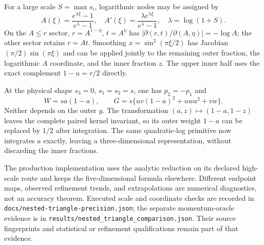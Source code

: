 For a large scale $S=\max s_i$, logarithmic nodes may be assigned by
\[
 A(\xi)=\frac{e^{\lambda\xi}-1}{e^\lambda-1},\quad
 A'(\xi)=\frac{\lambda e^{\lambda\xi}}{e^\lambda-1},\quad
 \lambda=\log(1+S).
\]
On the $A\le r$ sector, $r=A^{1-\eta}$, $t=A^\eta$ has
$|\partial(r,t)/\partial(A,\eta)|=-\log A$; the other sector retains
$r=At$. Smoothing $x=\sin^2(\pi\xi/2)$ has Jacobian
$(\pi/2)\sin(\pi\xi)$ and can be applied jointly to the remaining outer
fraction, the logarithmic $A$ coordinate, and the inner fraction $z$.
The upper inner half uses the exact complement $1-u=r/2$ directly.

At the physical shape $s_3=0$, $s_1=s_2=s$, one has $p_2=-p_1$ and
\[
 W=sa(1-a),\qquad
 G=s\{uv(1-a)^2+uwa^2+vw\}.
\]
Neither depends on the outer $y$. The transformation
$(a,z)\mapsto(1-a,1-z)$ leaves the complete paired kernel invariant, so
its outer weight $1-a$ can be replaced by $1/2$ after integration. The
same quadratic-log primitive now integrates $a$ exactly, leaving a
three-dimensional representation, without discarding the inner fractions.

The production implementation uses the analytic reduction on its declared
high-scale route and keeps the five-dimensional formula elsewhere. Different
endpoint maps, observed refinement trends, and extrapolations are numerical
diagnostics, not an accuracy theorem. Executed scale and coordinate checks
are recorded in \texttt{docs/nested-triangle-precision.json}; the separate
momentum-oracle evidence is in
\texttt{results/nested\_triangle\_comparison.json}. Their source fingerprints
and statistical or refinement qualifications remain part of that evidence.
